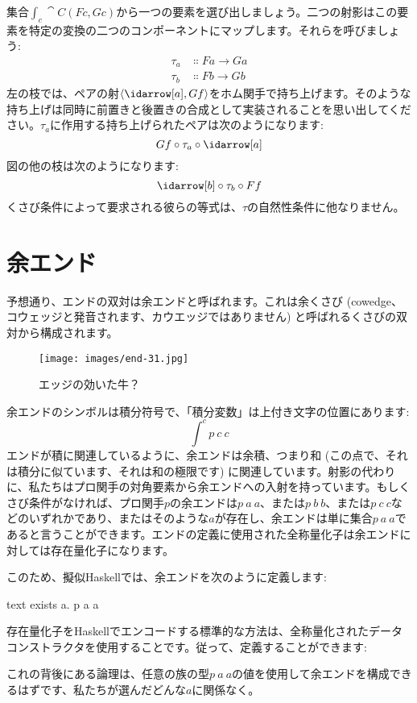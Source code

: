 \noindent
集合$\int_c \cat{C}(F c, G c)$から一つの要素を選び出しましょう。二つの射影はこの要素を特定の変換の二つのコンポーネントにマップします。それらを呼びましょう: 
\begin{align*}
  \tau_a & \Colon F a \to G a \\
  \tau_b & \Colon F b \to G b
\end{align*}
左の枝では、ペアの射$\langle \idarrow[a], G f \rangle$をホム関手で持ち上げます。そのような持ち上げは同時に前置きと後置きの合成として実装されることを思い出してください。$\tau_a$に作用する持ち上げられたペアは次のようになります: 
\[G f \circ \tau_a \circ \idarrow[a]\]
図の他の枝は次のようになります: 
\[\idarrow[b] \circ \tau_b \circ F f\]
くさび条件によって要求される彼らの等式は、$\tau$の自然性条件に他なりません。

\section{余エンド}
予想通り、エンドの双対は余エンドと呼ばれます。これは余くさび (cowedge、コウェッジと発音されます、カウエッジではありません) と呼ばれるくさびの双対から構成されます。

\begin{figure}[H]
  \centering
  \texttt{[image: images/end-31.jpg]}
  \caption{エッジの効いた牛？}
\end{figure}

\noindent
余エンドのシンボルは積分符号で、「積分変数」は上付き文字の位置にあります: 
\[\int^c p\ c\ c\]
エンドが積に関連しているように、余エンドは余積、つまり和 (この点で、それは積分に似ています、それは和の極限です) に関連しています。射影の代わりに、私たちはプロ関手の対角要素から余エンドへの入射を持っています。もしくさび条件がなければ、プロ関手$p$の余エンドは$p\ a\ a$、または$p\ b\ b$、または$p\ c\ c$などのいずれかであり、またはそのような$a$が存在し、余エンドは単に集合$p\ a\ a$であると言うことができます。エンドの定義に使用された全称量化子は余エンドに対しては存在量化子になります。

このため、擬似Haskellでは、余エンドを次のように定義します: 

\begin{snip}{text}
exists a. p a a
\end{snip}
存在量化子をHaskellでエンコードする標準的な方法は、全称量化されたデータコンストラクタを使用することです。従って、定義することができます: 

これの背後にある論理は、任意の族の型$p\ a\ a$の値を使用して余エンドを構成できるはずです、私たちが選んだどんな$a$に関係なく。

